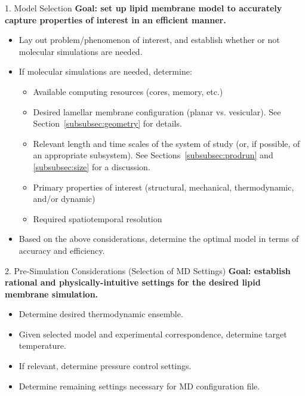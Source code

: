 \documentclass[9pt,bestpractices]{livecoms}
\begin{document}
\begin{Checklists*}[p!]

\begin{checklist}{1. Model Selection}
\textbf{Goal: set up lipid membrane model to accurately capture properties of interest in an efficient manner.}
\begin{itemize}
\item Lay out problem/phenomenon of interest, and establish whether or not molecular simulations are needed.
\item If molecular simulations are needed, determine:
	\begin{itemize}
	\item Available computing resources (cores, memory, etc.)
	\item Desired lamellar membrane configuration (planar vs. vesicular). See Section~\ref{subsubsec:geometry} for details.
	\item Relevant length and time scales of the system of study (or, if possible, of an appropriate subsystem). See Sections~\ref{subsubsec:prodrun} and \ref{subsubsec:size} for a discussion.
	\item Primary properties of interest (structural, mechanical, thermodynamic, and/or dynamic)
	\item Required spatiotemporal resolution
	\end{itemize}
\item Based on the above considerations, determine the optimal model in terms of accuracy and efficiency.
\end{itemize}
\end{checklist}

\begin{checklist}{2. Pre-Simulation Considerations (Selection of MD Settings)}
\textbf{Goal: establish rational and physically-intuitive settings for the desired lipid membrane simulation.}
\begin{itemize}
\item Determine desired thermodynamic ensemble.
\item Given selected model and experimental correspondence, determine target temperature.
\item If relevant, determine pressure control settings.
\item Determine remaining settings necessary for MD configuration file.
\end{itemize}
\end{checklist}


\end{Checklists*}
\end{document}
